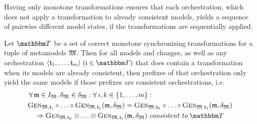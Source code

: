Having only monotone transformations ensures that each orchestration, which does not apply a transformation to already consistent models, yields a sequence of pairwise different model states, if the transformations are sequentially applied.
\begin{lemma}
    \label{lemma:monotonetransformationsnosamestates}
    Let $\transformationset{T}$ be a set of correct monotone synchronizing transformations for a tuple of metamodels $\mathfrak{M}$.
    Then for all models and changes, as well as any orchestration $\tupled{\transformation{t}_{1}, \dots, \transformation{t}_{m}}  \; (\transformation{i} \in \transformationset{T})$ that does contain a transformation when its models are already consistent, then prefixes of that orchestration only yield the same models if those prefixes are consistent orchestrations, i.e.
    \begin{align*}
        &
        \forall \modeltuple{m} \in \metamodeltupleinstanceset{M}, \changetuple{\metamodeltuple{M}} \in \changetuple{\metamodeltuple{M}} : \forall i, k \in \setted{1, \dots, m} : \\
        &
        \generalizationfunction{\metamodeltuple{M}, \transformation{t}_{i}} \concatfunction \dots \concatfunction \generalizationfunction{\metamodeltuple{M}, \transformation{t}_{1}}(\modeltuple{m}, \changetuple{\metamodeltuple{M}}) = \generalizationfunction{\metamodeltuple{M}, \transformation{t}_{k}} \concatfunction \dots \concatfunction \generalizationfunction{\metamodeltuple{M}, \transformation{t}_{1}}(\modeltuple{m}, \changetuple{\metamodeltuple{M}}) \\
        & \formulaskip 
        \Rightarrow
        \generalizationfunction{\metamodeltuple{M}, \transformation{t}_{k}} \concat \dots \concat \generalizationfunction{\metamodeltuple{M}, \transformation{t}_{1}}(\modeltuple{m}, \changetuple{\metamodeltuple{M}}) \consistenttomath \transformationset{T}
        \end{align*}
\end{lemma}
